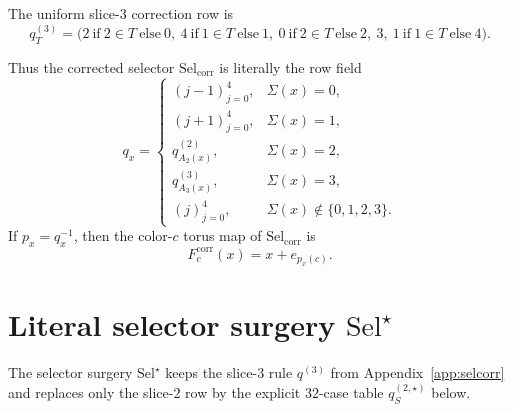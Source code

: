 \documentclass[11pt]{article}
\newcommand{\SelCorr}{\mathrm{Sel}_{\mathrm{corr}}}
\newcommand{\SelStar}{\mathrm{Sel}^{\star}}
\begin{document}
The uniform slice-\(3\) correction row is
\[
q^{(3)}_T=
\bigl(
2\ \text{if}\ 2\in T\ \text{else}\ 0,\ 
4\ \text{if}\ 1\in T\ \text{else}\ 1,\ 
0\ \text{if}\ 2\in T\ \text{else}\ 2,\ 
3,\ 
1\ \text{if}\ 1\in T\ \text{else}\ 4
\bigr).
\]

Thus the corrected selector \(\SelCorr\) is literally the row field
\[
q_x=
\begin{cases}
(j-1)_{j=0}^4, & \Sigma(x)=0,\\
(j+1)_{j=0}^4, & \Sigma(x)=1,\\
q^{(2)}_{A_2(x)}, & \Sigma(x)=2,\\
q^{(3)}_{A_3(x)}, & \Sigma(x)=3,\\
(j)_{j=0}^4, & \Sigma(x)\notin\{0,1,2,3\}.
\end{cases}
\]
If \(p_x=q_x^{-1}\), then the color-\(c\) torus map of \(\SelCorr\) is
\[
F_c^{\mathrm{corr}}(x)=x+e_{p_x(c)}.
\]

\section{Literal selector surgery \texorpdfstring{\(\SelStar\)}{SelStar}}
\label{app:selstar}

The selector surgery \(\SelStar\) keeps the slice-\(3\) rule \(q^{(3)}\) from
Appendix~\ref{app:selcorr} and replaces only the slice-\(2\) row by the
explicit \(32\)-case table \(q^{(2,\star)}_S\) below.
\end{document}
